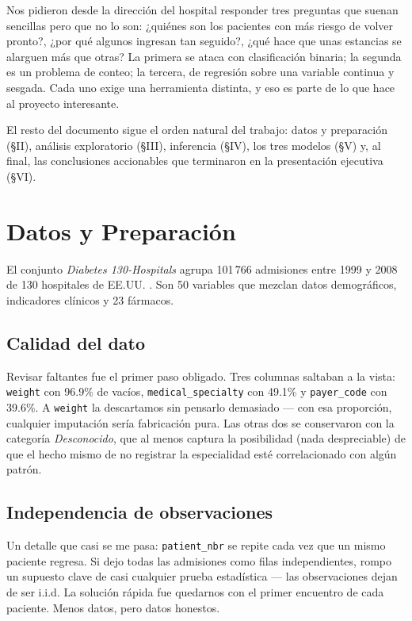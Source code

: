 \documentclass[conference]{IEEEtran}
\begin{document}
Nos pidieron desde la dirección del hospital responder tres preguntas que suenan sencillas pero que no lo son: ¿quiénes son los pacientes con más riesgo de volver pronto?, ¿por qué algunos ingresan tan seguido?, ¿qué hace que unas estancias se alarguen más que otras? La primera se ataca con clasificación binaria; la segunda es un problema de conteo; la tercera, de regresión sobre una variable continua y sesgada. Cada uno exige una herramienta distinta, y eso es parte de lo que hace al proyecto interesante.

El resto del documento sigue el orden natural del trabajo: datos y preparación (§II), análisis exploratorio (§III), inferencia (§IV), los tres modelos (§V) y, al final, las conclusiones accionables que terminaron en la presentación ejecutiva (§VI).

\section{Datos y Preparación}
El conjunto \textit{Diabetes 130-Hospitals} agrupa 101\,766 admisiones entre 1999 y 2008 de 130 hospitales de EE.UU. \cite{strack2014}. Son 50 variables que mezclan datos demográficos, indicadores clínicos y 23 fármacos.

\subsection{Calidad del dato}
Revisar faltantes fue el primer paso obligado. Tres columnas saltaban a la vista: \texttt{weight} con 96.9\% de vacíos, \texttt{medical\_specialty} con 49.1\% y \texttt{payer\_code} con 39.6\%. A \texttt{weight} la descartamos sin pensarlo demasiado --- con esa proporción, cualquier imputación sería fabricación pura. Las otras dos se conservaron con la categoría \textit{Desconocido}, que al menos captura la posibilidad (nada despreciable) de que el hecho mismo de no registrar la especialidad esté correlacionado con algún patrón.

\subsection{Independencia de observaciones}
Un detalle que casi se me pasa: \texttt{patient\_nbr} se repite cada vez que un mismo paciente regresa. Si dejo todas las admisiones como filas independientes, rompo un supuesto clave de casi cualquier prueba estadística --- las observaciones dejan de ser i.i.d. La solución rápida fue quedarnos con el primer encuentro de cada paciente. Menos datos, pero datos honestos.
\end{document}

